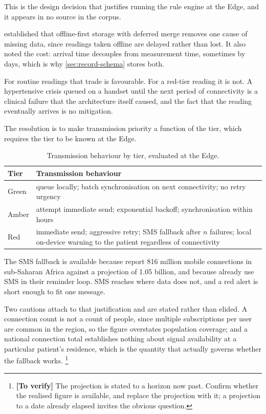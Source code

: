 \documentclass[12pt,a4paper,oneside]{report}
\newcommand{\verify}[1]{\footnote{\textbf{[To verify]} #1}}
\begin{document}
This is the design decision that justifies running the rule engine at the Edge, and it appears in no source in the corpus.

 established that offline-first storage with deferred merge removes one cause of missing data, since readings taken offline are delayed rather than lost. It also noted the cost: arrival time decouples from measurement time, sometimes by days, which is why \cref{sec:record-schema} stores both.

For routine readings that trade is favourable. For a red-tier reading it is not. A hypertensive crisis queued on a handset until the next period of connectivity is a clinical failure that the architecture itself caused, and the fact that the reading eventually arrives is no mitigation.

The resolution is to make transmission priority a function of the tier, which requires the tier to be known at the Edge.

\begin{table}[htbp]
\centering\small
\caption{Transmission behaviour by tier, evaluated at the Edge.}\label{tab:transmission-priority}
\begin{tabularx}{\textwidth}{@{}>{\raggedright\arraybackslash}p{2.0cm} X@{}}
\toprule
\textbf{Tier} & \textbf{Transmission behaviour} \\
\midrule
Green & queue locally; batch synchronisation on next connectivity; no retry urgency \\
Amber & attempt immediate send; exponential backoff; synchronisation within hours \\
Red & immediate send; aggressive retry; SMS fallback after $n$ failures; local on-device warning to the patient regardless of connectivity \\
\bottomrule
\end{tabularx}
\end{table}

The SMS fallback is available because \textcite{dodoo2022} report 816 million mobile connections in sub-Saharan Africa against a projection of 1.05 billion, and because \textcite{yazdani2018} already use SMS in their reminder loop. SMS reaches where data does not, and a red alert is short enough to fit one message.

Two cautions attach to that justification and are stated rather than elided. A connection count is not a count of people, since multiple subscriptions per user are common in the region, so the figure overstates population coverage; and a national connection total establishes nothing about signal availability at a particular patient's residence, which is the quantity that actually governs whether the fallback works.%
\verify{The \textcite{dodoo2022} projection is stated to a horizon now past. Confirm whether the realised figure is available, and replace the projection with it; a projection to a date already elapsed invites the obvious question.}
\end{document}
